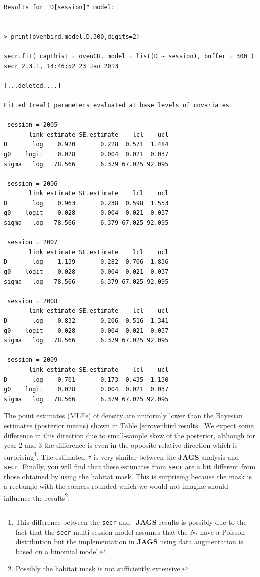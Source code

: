 {\small
\begin{verbatim}
Results for "D[session]" model:


> print(ovenbird.model.D.300,digits=2)

secr.fit( capthist = ovenCH, model = list(D ~ session), buffer = 300 )
secr 2.3.1, 14:46:52 23 Jan 2013

[...deleted....]

Fitted (real) parameters evaluated at base levels of covariates 

 session = 2005 
       link estimate SE.estimate    lcl    ucl
D       log    0.920       0.228  0.571  1.484
g0    logit    0.028       0.004  0.021  0.037
sigma   log   78.566       6.379 67.025 92.095

 session = 2006 
       link estimate SE.estimate    lcl    ucl
D       log    0.963       0.238  0.598  1.553
g0    logit    0.028       0.004  0.021  0.037
sigma   log   78.566       6.379 67.025 92.095

 session = 2007 
       link estimate SE.estimate    lcl    ucl
D       log    1.139       0.282  0.706  1.836
g0    logit    0.028       0.004  0.021  0.037
sigma   log   78.566       6.379 67.025 92.095

 session = 2008 
       link estimate SE.estimate    lcl    ucl
D       log    0.832       0.206  0.516  1.341
g0    logit    0.028       0.004  0.021  0.037
sigma   log   78.566       6.379 67.025 92.095

 session = 2009 
       link estimate SE.estimate    lcl    ucl
D       log    0.701       0.173  0.435  1.130
g0    logit    0.028       0.004  0.021  0.037
sigma   log   78.566       6.379 67.025 92.095
\end{verbatim}
}
The point estimates (MLEs) of density are uniformly lower than the Bayesian estimates
(posterior means)
shown in Table \ref{scrovenbird.results}.
We expect some difference in this direction due to
small-sample skew of the posterior, although for year 2 and 3 the
difference is even in the opposite relative direction which is
surprising\footnote{This difference between the \mbox{\tt secr} and \mbox{\bf
  JAGS} results is possibly due to the fact that the \mbox{\tt secr}
multi-session 
model assumes that the $N_{t}$ have a Poisson distribution but the
implementation in {\bf JAGS} using data augmentation is based on a
binomial model.}.
The estimated $\sigma$ is very similar between the {\bf JAGS}
analysis and \mbox{\tt secr}.
Finally, you will find that these estimates from \mbox{\tt secr}
 are a bit different from those obtained by
using the habitat mask. This is surprising because the mask
is a rectangle with the corners
rounded which we would not imagine should influence the results\footnote{
Possibly the habitat mask is not sufficiently extensive.}.


